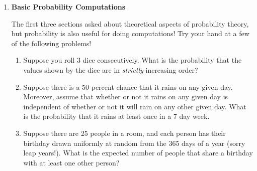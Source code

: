 \begin{enumerate}[leftmargin=\parindent, itemsep=3ex]
    \item{\bf Basic Probability Computations}

    The first three sections asked about theoretical aspects of probability theory, but probability is also useful for doing computations! Try your hand at a few of the following problems!

    \begin{enumerate}
        \item Suppose you roll 3 dice consecutively. What is the probability that the values shown by the dice are in \textit{strictly} increasing order?
        \item Suppose there is a 50 percent chance that it rains on any given day. Moreover, assume that whether or not it rains on any given day is independent of whether or not it will rain on any other given day. What is the probability that it rains at least once in a 7 day week.
        \item Suppose there are 25 people in a room, and each person has their birthday drawn uniformly at random from the 365 days of a year (sorry leap years!). What is the expected number of people that share a birthday with at least one other person?
    \end{enumerate}
\end{enumerate}
